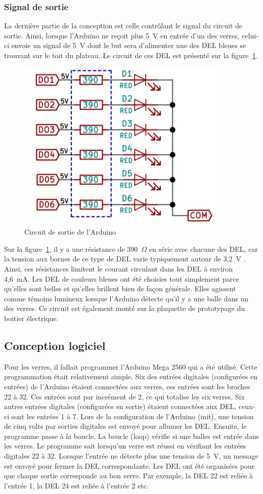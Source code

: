 \subsubsection{Signal de sortie}

La dernière partie de la conception est celle contrôlant le signal du circuit de sortie.
Ainsi, lorsque l’Arduino ne reçoit plus 5~V en entrée d’un des verres, celui-ci envoie un signal de 5~V dont le but sera d’alimenter une des DEL bleues se trouvant sur le toit du plateau.
Le circuit de ces DEL est présenté sur la figure~\ref{fig:s2-verre-Figure6}.

\begin{figure}[h!]
    \centering
    \includegraphics[width=0.4\linewidth]{img/s2/verre/Figure6}
    \caption{Circuit de sortie de l'Arduino}
    \label{fig:s2-verre-Figure6}
\end{figure}

Sur la figure~\ref{fig:s2-verre-Figure6}, il y a une résistance de 390~$\Omega$ en série avec chacune des DEL, car la tension aux bornes de ce type de DEL varie typiquement autour de 3,2~V \cite{noauthor_data_2007}.
Ainsi, ces résistances limitent le courant circulant dans les DEL à environ 4,6~mA.
Les DEL de couleurs bleues ont été choisies tout simplement parce qu’elles sont belles et qu’elles brillent bien de façon générale.
Elles agissent comme témoins lumineux lorsque l’Arduino détecte qu’il y a une balle dans un des verres.
Ce circuit est également monté sur la plaquette de prototypage du boitier électrique.

\subsection{Conception logiciel}

Pour les verres, il fallait programmer l'Arduino Mega 2560 qui a été utilisé.
Cette programmation était relativement simple.
Six des entrées digitales (configurées en entrées) de l'Arduino étaient connectées aux verres, ces entrées sont les broches 22 à 32.
Ces entrées sont par incrément de 2, ce qui totalise les six verres.
Six autres entrées digitales (configurées en sortie) étaient connectées aux DEL, ceux-ci sont les entrées 1 à 7.
Lors de la configuration de l'Arduino (init), une tension de cinq volts par sorties digitales est envoyé pour allumer les DEL.
Ensuite, le programme passe à la boucle.
La boucle (loop) vérifie si une balles est entrée dans les verres.
Le programme sait lorsqu'un verre est réussi en vérifiant les entrées digitales 22 à 32.
Lorsque l'entrée ne détecte plus une tension de 5~V, un message est envoyé pour fermer la DEL correspondante.
Les DEL ont été organisées pour que chaque sortie corresponde au bon verre.
Par exemple, la DEL 22 est reliée à l’entrée 1, la DEL 24 est reliée à l’entrée 2 etc.

